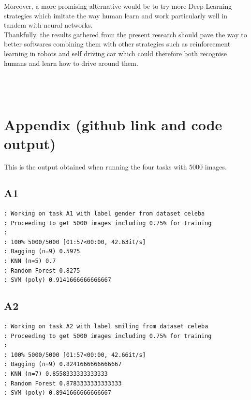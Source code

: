 \documentclass[a4paper,12pt,twoside,twocolumn]{article}
\begin{document}
Moreover, a more promising alternative would be to try more Deep Learning strategies which imitate the way human learn and work particularly well in tandem with neural networks.\\

Thankfully, the results gathered from the present research should pave the way to better softwares combining them with other strategies such as reinforcement learning in robots and self driving car which could therefore both recognise humans and learn how to drive around them.\\

\pagebreak\\

\vfill \pagebreak \printbibliography \vfill\null\\
\pagebreak \vfill\null \pagebreak\\

\section{Appendix (github link and code output)}
\label{sec:orgc6f95d3}

This is the output obtained when running the four tasks with 5000 images.\\

\subsection{A1}
\label{sec:org2688140}

\begin{verbatim}
: Working on task A1 with label gender from dataset celeba
: Proceeding to get 5000 images including 0.75% for training
: 
: 100% 5000/5000 [01:57<00:00, 42.63it/s]
: Bagging (n=9) 0.5975
: KNN (n=5) 0.7
: Random Forest 0.8275
: SVM (poly) 0.9141666666666667
\end{verbatim}

\subsection{A2}
\label{sec:orgda19819}

\begin{verbatim}
: Working on task A2 with label smiling from dataset celeba
: Proceeding to get 5000 images including 0.75% for training
: 
: 100% 5000/5000 [01:57<00:00, 42.66it/s]
: Bagging (n=9) 0.8241666666666667
: KNN (n=7) 0.8558333333333333
: Random Forest 0.8783333333333333
: SVM (poly) 0.8941666666666667
\end{verbatim}
\end{document}
